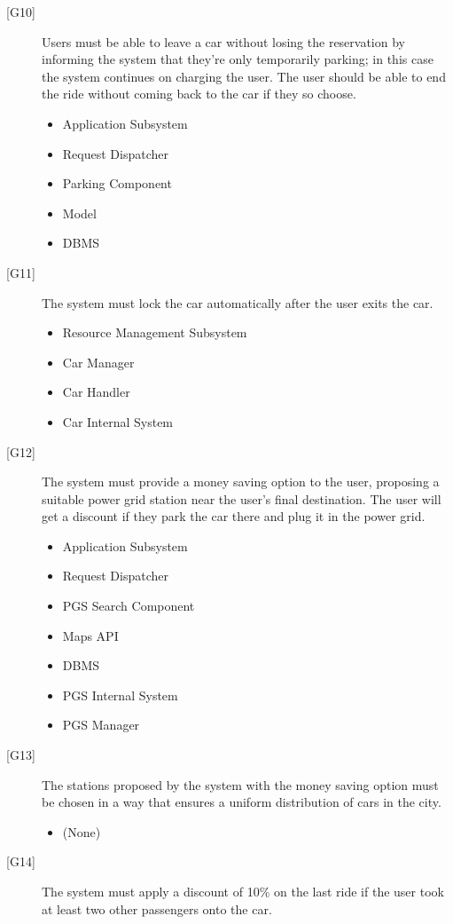 \documentclass[english]{article}
\begin{document}
\begin{description}
	\item[{[G10]}]{Users must be able to leave a car without losing the reservation by informing the system that they’re only temporarily parking; in this case the system continues on charging the user. The user should be able to end the ride without coming back to the car if they so choose.}
	\begin{itemize}
		\item{Application Subsystem}
		\item{Request Dispatcher}
		\item{Parking Component}
		\item{Model}
		\item{DBMS}
	\end{itemize}
	\item[{[G11]}]{The system must lock the car automatically after the user exits the car.}
	\begin{itemize}
		\item{Resource Management Subsystem}
		\item{Car Manager}
		\item{Car Handler}
		\item{Car Internal System}
	\end{itemize}
	\item[{[G12]}]{The system must provide a money saving option to the user, proposing a suitable power grid station near the user’s final destination. The user will get a discount if they park the car there and plug it in the power grid.}
	\begin{itemize}
		\item{Application Subsystem}
		\item{Request Dispatcher}
		\item{PGS Search Component}
		\item{Maps API}
		\item{DBMS}
		\item{PGS Internal System}
		\item{PGS Manager}
	\end{itemize}
	\item[{[G13]}]{The stations proposed by the system with the money saving option must be chosen in a way that ensures a uniform distribution of cars in the city.}
	\begin{itemize}
		\item{(None)}
	\end{itemize}
	\item[{[G14]}]{The system must apply a discount of 10\% on the last ride if the user took at least two other passengers onto the car.}

\end{description}
\end{document}

